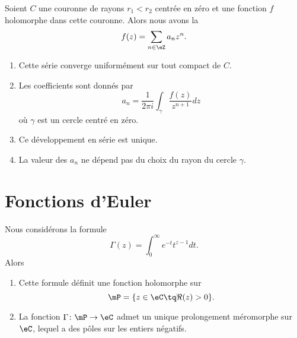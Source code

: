 \begin{theorem}       \label{THOooMKJOooVghZyG}
    Soient \( C\) une couronne de rayons \( r_1<r_2\) centrée en zéro et une fonction \( f\) holomorphe dans cette couronne. Alors nous avons la 
    \begin{equation}
        f(z)=\sum_{n\in \eZ}a_nz^n.
    \end{equation}
    \begin{enumerate}
        \item
            Cette série converge uniformément sur tout compact de \( C\).
        \item
            Les coefficients sont donnés par
            \begin{equation}
                a_n=\frac{1}{ 2\pi i }\int_{\gamma}\frac{ f(z) }{ z^{n+1} }dz
            \end{equation}
            où \( \gamma\) est un cercle centré en zéro.
        \item
            Ce développement en série est unique.
        \item
            La valeur des \( a_n\) ne dépend pas du choix du rayon du cercle \( \gamma\).
    \end{enumerate}
\end{theorem}

\section{Fonctions d'Euler}

\begin{theorem}   \label{ThoZJYooWKfbVz}
    Nous considérons la formule
    \begin{equation}
        \Gamma(z)=\int_0^{\infty} e^{-t}t^{z-1}dt.
    \end{equation}
    Alors
    \begin{enumerate}
        \item
            Cette formule définit une fonction holomorphe sur
            \begin{equation}
                \mP=\{ z\in \eC\tq \Re(z)>0 \}.
            \end{equation}
        \item
            La fonction \( \Gamma\colon \mP\to \eC\) admet un unique prolongement méromorphe sur \( \eC\), lequel a des pôles sur les entiers négatifs.
    \end{enumerate}
\end{theorem}

